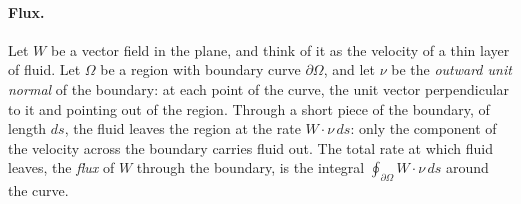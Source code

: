 \paragraph{Flux.} Let $W$ be a vector field in the plane, and think of it as the velocity of a thin layer of fluid. Let $\Omega$ be a region with boundary curve $\partial\Omega$, and let $\nu$ be the \emph{outward unit normal} of the boundary: at each point of the curve, the unit vector perpendicular to it and pointing out of the region. Through a short piece of the boundary, of length $ds$, the fluid leaves the region at the rate $W\cdot\nu\, ds$: only the component of the velocity across the boundary carries fluid out. The total rate at which fluid leaves, the \emph{flux} of $W$ through the boundary, is the integral $\oint_{\partial\Omega} W\cdot\nu\, ds$ around the curve.

